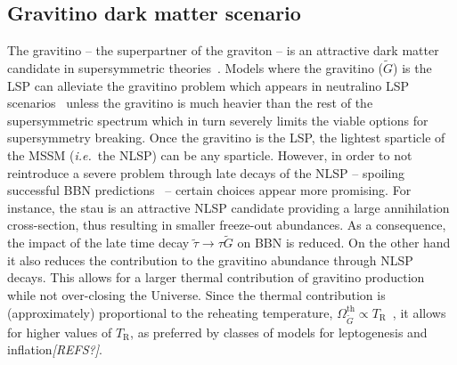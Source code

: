 \documentclass[preprint,number,sort&compress,twocolumn,3p]{elsstyarticle}
\newcommand{\s}[1]{\widetilde{#1}}
\newcommand{\com}[1]{\emph{\color{red}[#1]}}  %
\begin{document}
\subsection{Gravitino dark matter scenario}\label{sec:grav}

The gravitino -- the superpartner of the graviton -- is an attractive dark matter candidate in supersymmetric theories~\cite{Fayet:1981sq,Pagels:1981ke}. Models where the gravitino ($\tilde G$) is the LSP can alleviate the gravitino problem
which appears in neutralino LSP scenarios~\cite{Weinberg:1982zq,Ellis:1984eq,Falomkin:1984eu,Ellis:1984er}
unless the gravitino is much heavier than the rest of the supersymmetric spectrum which in turn severely limits the viable options for supersymmetry breaking.
Once the gravitino is the LSP, the lightest sparticle of the MSSM (\emph{i.e.}~the NLSP) can be any sparticle. However, in order to not reintroduce a severe problem through
late decays of the NLSP -- spoiling successful BBN predictions~\cite{Moroi:1993mb} -- certain choices
appear more promising. For instance, the stau is an attractive NLSP candidate  providing a large annihilation cross-section, thus resulting in smaller freeze-out abundances. As a consequence, the impact of the late time decay $\tilde{\tau} \to \tau \tilde G$ on BBN is reduced.
On the other hand it also reduces the contribution to the gravitino abundance through NLSP decays. This allows for a larger thermal contribution of gravitino production while not over-closing the Universe. Since the thermal contribution is (approximately) proportional
to the reheating temperature, $\Omega^{\text{th}}_{\s G}\propto T_\text{R}$~\cite{Bolz:1998ek,Bolz:2000fu,Pradler:2006hh},
it allows for higher values of $T_\text{R}$, as preferred by classes of models for leptogenesis and
inflation\com{REFS?}.
\end{document}

